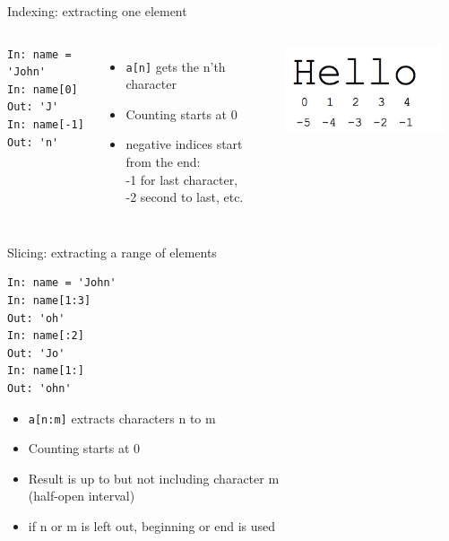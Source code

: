 \documentclass[aspectratio=169,usenames,dvipsnames]{beamer}
\begin{document}
\begin{frame}[fragile]{Indexing: extracting one element}
\begin{columns}
\begin{lstlisting}
In: name = 'John'
In: name[0]
Out: 'J'
In: name[-1]
Out: 'n'
\end{lstlisting}
    \begin{itemize}
        \item \lstinline{a[n]} gets the n'th character
        \item Counting starts at 0
        \item negative indices start from the end:\\
            -1 for last character, \\
            -2 second to last, etc.
    \end{itemize}
    \includegraphics[width=0.9\textwidth]{fig/indexing}
\end{columns}
\end{frame}

\begin{frame}[fragile]{Slicing: extracting a range of elements}
\begin{lstlisting}
In: name = 'John'
In: name[1:3]
Out: 'oh'
In: name[:2]
Out: 'Jo'
In: name[1:]
Out: 'ohn'
\end{lstlisting}
    \begin{itemize}
        \item \lstinline{a[n:m]} extracts characters n to m
        \item Counting starts at 0
        \item Result is up to but not including character m \\
                (half-open interval)
        \item if n or m is left out, beginning or end is used
    \end{itemize}
\end{frame}
\end{document}
